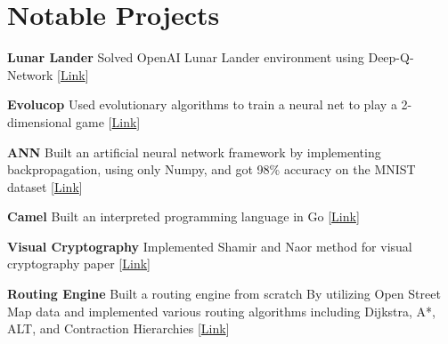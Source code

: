 \section{Notable Projects}

\begin{small}

\textbf{Lunar Lander} Solved OpenAI Lunar Lander environment using Deep-Q-Network [\href{https://github.com/mehrdad3301/Lunar-Lander}{Link}] 

\textbf{Evolucop} Used evolutionary algorithms to train a neural net to play a 2-dimensional game [\href{https://github.com/mehrdad3301/Evolucop}{Link}]
 

\textbf{ANN} Built an artificial neural network framework by implementing backpropagation, using only Numpy, and got 98\% accuracy on the MNIST dataset [\href{https://github.com/mehrdad3301/ANN}{Link}]

\textbf{Camel} Built an interpreted programming language in Go [\href{https://github.com/camel-lang/interpreter}{Link}] 

\textbf{Visual Cryptography} Implemented Shamir and Naor method for visual cryptography paper [\href{https://github.com/mehrdad3301/visual-cryptography}{Link}] 

\textbf{Routing Engine} Built a routing engine from scratch By utilizing Open Street Map data and implemented various routing algorithms including Dijkstra, A*, ALT, and Contraction Hierarchies  [\href{https://github.com/mehrdad3301/Coyote}{Link}] 

\end{small}
